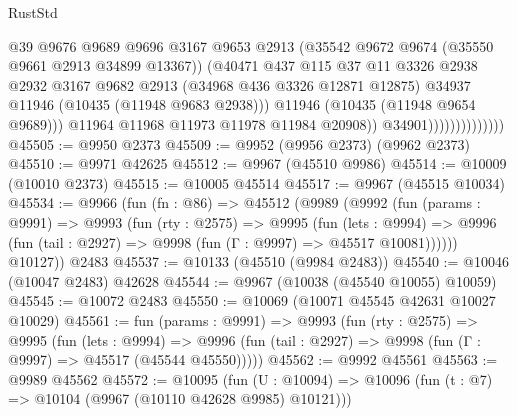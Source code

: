 \begin{lexlean}{RustStd}
\begin{coremodule}
                                      @39
                                      @9676
                                      @9689
                                      @9696
                                      @3167
                                      @9653
                                      @2913
                                      (@35542 @9672 @9674 (@35550 @9661 @2913 @34899 @13367))
                                      (@40471
                                        @437
                                        @115
                                        @37
                                        @11
                                        @3326
                                        @2938
                                        @2932
                                        @3167
                                        @9682
                                        @2913
                                        (@34968 @436 @3326 @12871 @12875)
                                        @34937
                                        @11946
                                        (@10435 (@11948 @9683 @2938)))
                                      @11946
                                      (@10435 (@11948 @9654 @9689)))
                                    @11964
                                    @11968
                                    @11973
                                    @11978
                                    @11984
                                    @20908))
                                @34901))))))))))))))
@45505 := @9950 @2373
@45509 := @9952 (@9956 @2373) (@9962 @2373)
@45510 := @9971 @42625
@45512 := @9967 (@45510 @9986)
@45514 := @10009 (@10010 @2373)
@45515 := @10005 @45514
@45517 := @9967 (@45515 @10034)
@45534 := @9966
    (fun (fn : @86) =>
    @45512
      (@9989
        (@9992
          (fun (params : @9991) =>
          @9993
            (fun (rty : @2575) =>
            @9995
              (fun (lets : @9994) =>
              @9996 (fun (tail : @2927) => @9998 (fun (Γ : @9997) => @45517 @10081))))))
        @10127))
    @2483
@45537 := @10133 (@45510 (@9984 @2483))
@45540 := @10046 (@10047 @2483) @42628
@45544 := @9967 (@10038 (@45540 @10055) @10059)
@45545 := @10072 @2483
@45550 := @10069 (@10071 @45545 @42631 @10027 @10029)
@45561 := fun (params : @9991) =>
  @9993
    (fun (rty : @2575) =>
    @9995
      (fun (lets : @9994) =>
      @9996 (fun (tail : @2927) => @9998 (fun (Γ : @9997) => @45517 (@45544 @45550)))))
@45562 := @9992 @45561
@45563 := @9989 @45562
@45572 := @10095
    (fun (U : @10094) => @10096 (fun (t : @7) => @10104 (@9967 (@10110 @42628 @9985) @10121)))

\end{coremodule}
\end{lexlean}
